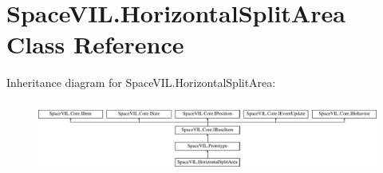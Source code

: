 \hypertarget{class_space_v_i_l_1_1_horizontal_split_area}{}\section{Space\+V\+I\+L.\+Horizontal\+Split\+Area Class Reference}
\label{class_space_v_i_l_1_1_horizontal_split_area}
Inheritance diagram for Space\+V\+I\+L.\+Horizontal\+Split\+Area\+:\begin{figure}[H]
\begin{center}
\leavevmode
\includegraphics[height=2.382979cm]{class_space_v_i_l_1_1_horizontal_split_area}
\end{center}
\end{figure}

